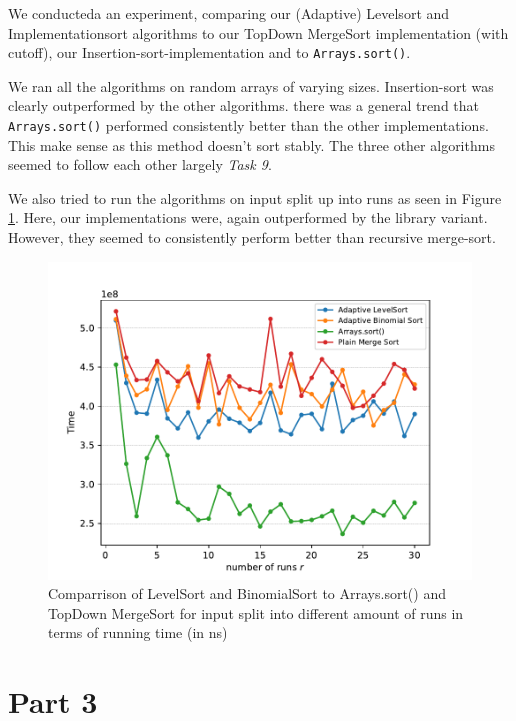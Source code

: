 \documentclass[11pt, a4paper]{article}
\begin{document}
We conducteda an experiment, comparing our (Adaptive) Levelsort and Implementationsort algorithms to our TopDown MergeSort implementation (with cutoff), our Insertion-sort-implementation and to \verb|Arrays.sort()|. 

We ran all the algorithms on random arrays of varying sizes.  Insertion-sort was clearly outperformed by the other algorithms. there was a general trend that \verb|Arrays.sort()| performed consistently better than the other implementations. This make sense as this method doesn't sort stably. The three other algorithms seemed to follow each other largely \textit{Task 9}.

We also tried to run the algorithms on input split up into runs as seen in Figure \ref{fig:adaptComp}. Here, our implementations were, again outperformed by the library variant. However, they seemed to consistently perform better than recursive merge-sort. 

\begin{figure}[h]
  \begin{center}
    \includegraphics[width=\textwidth]{plot/t10runs_time_plot.pdf}
    \caption{Comparrison of LevelSort and BinomialSort to Arrays.sort() and TopDown MergeSort for input split into different amount of runs in terms of running time (in ns)}
    \label{fig:adaptComp}
  \end{center}
\end{figure}




\section{Part 3}
\end{document}
